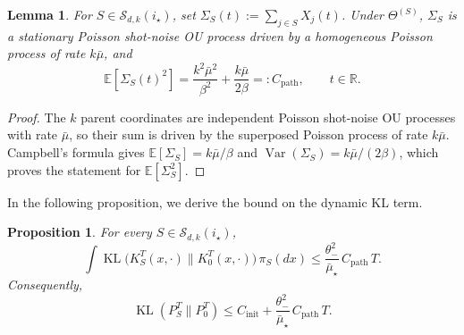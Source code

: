 \documentclass{article}
\newtheorem{lemma}{Lemma}[section]
\newtheorem{proposition}{Proposition}[section]
\newcommand{\KL}{\operatorname{KL}}
\newcommand{\thetalo}{\theta_-}
\newcommand{\R}{\mathbb{R}}
\newcommand{\E}{\mathbb{E}}
\begin{document}
\begin{lemma}\label{lem:app-moment-k}
For $S\in\mathcal S_{d,k}(i_\star)$, set
$\Sigma_S(t):=\sum_{j\in S}X_j(t)$. Under $\Theta^{(S)}$, $\Sigma_S$ is a
stationary Poisson shot-noise OU process driven by a homogeneous Poisson process
of rate $k\bar\mu$, and
\[
\E[\Sigma_S(t)^2]
=\frac{k^2\bar\mu^2}{\beta^2}+\frac{k\bar\mu}{2\beta}
=:C_{\mathrm{path}},
\qquad t\in\R.
\]
\end{lemma}

\begin{proof}
The $k$ parent coordinates are independent Poisson shot-noise OU processes with
rate $\bar\mu$, so their sum is driven by the superposed Poisson process of rate
$k\bar\mu$. Campbell's formula gives
$\E[\Sigma_S]=k\bar\mu/\beta$ and
$\operatorname{Var}(\Sigma_S)=k\bar\mu/(2\beta)$, which proves the statement for
$\E[\Sigma_S^2]$.
\end{proof}


In the following proposition, we derive the bound on the dynamic KL term.
\begin{proposition}\label{prop:app-dynamic-KL}
For every $S\in\mathcal S_{d,k}(i_\star)$,
\[
\int \KL\!\bigl(K_S^T(x,\cdot)\|K_0^T(x,\cdot)\bigr)\,\pi_S(dx)
\le
\frac{\thetalo^2}{\bar\mu_\star}\,C_{\mathrm{path}}\,T.
\]
Consequently,
\[
\KL(P_S^T\|P_0^T)\le C_{\mathrm{init}}
+\frac{\thetalo^2}{\bar\mu_\star}\,C_{\mathrm{path}}\,T.
\]
\end{proposition}
\end{document}
